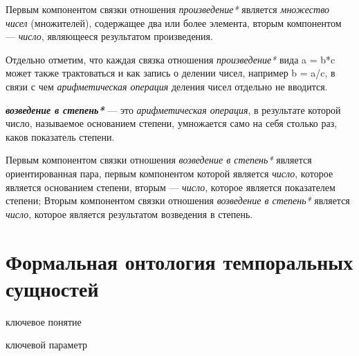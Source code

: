 Первым компонентом связки отношения \textit{произведение*} является \textit{множество чисел} (множителей), содержащее два или более элемента, вторым компонентом --- \textit{число}, являющееся результатом произведения.
		
Отдельно отметим, что каждая связка отношения \textit{произведение*} вида a = b*c может также трактоваться и как запись о делении чисел, например b = a/c, в связи с чем \textit{арифметическая операция} деления чисел отдельно не вводится.

\begin{SCn}
\end{SCn}

\textbf{\textit{возведение в степень*}} --- это \textit{арифметическая операция}, в результате которой число, называемое основанием степени, умножается само на себя столько раз, каков показатель степени.
	
Первым компонентом связки отношения \textit{возведение в степень*} является ориентированная пара, первым компонентом которой является \textit{число}, которое является основанием степени, вторым --- \textit{число}, которое является показателем степени; Вторым компонентом связки отношения \textit{возведение в степень*} является \textit{число}, которое является результатом возведения в степень.

\begin{SCn}	
\end{SCn}
	
\section{Формальная онтология темпоральных сущностей}
\label{sec_top_ontologies_temp}
	
\begin{SCn}
\begin{scnrelfromlist}{ключевое понятие}
\end{scnrelfromlist}

\begin{scnrelfromlist}{ключевой параметр}
\end{scnrelfromlist}
\end{SCn}
		
